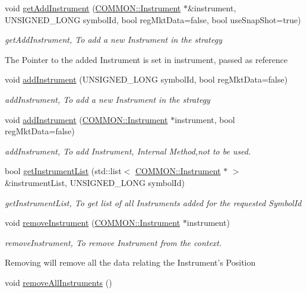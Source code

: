 \begin{DoxyCompactItemize}
void \hyperlink{class_a_p_i2_1_1_s_g_context_af8c29693539afd24c6dd420972c8871e}{get\-Add\-Instrument} (\hyperlink{class_a_p_i2_1_1_c_o_m_m_o_n_1_1_instrument}{C\-O\-M\-M\-O\-N\-::\-Instrument} $\ast$\&instrument, U\-N\-S\-I\-G\-N\-E\-D\-\_\-\-L\-O\-N\-G symbol\-Id, bool reg\-Mkt\-Data=false, bool use\-Snap\-Shot=true)
\begin{DoxyCompactList}\small\item\em get\-Add\-Instrument, To add a new Instrument in the strategy \par
 The Pointer to the added Instrument is set in instrument, passed as reference \end{DoxyCompactList}\item 
void \hyperlink{class_a_p_i2_1_1_s_g_context_ae7ae8c2b8c3b50861706d749bcceb77a}{add\-Instrument} (U\-N\-S\-I\-G\-N\-E\-D\-\_\-\-L\-O\-N\-G symbol\-Id, bool reg\-Mkt\-Data=false)
\begin{DoxyCompactList}\small\item\em add\-Instrument, To add a new Instrument in the strategy \par
 \end{DoxyCompactList}\item 
void \hyperlink{class_a_p_i2_1_1_s_g_context_a19cdaf5b68ddbd2632749dcc4b65cce6}{add\-Instrument} (\hyperlink{class_a_p_i2_1_1_c_o_m_m_o_n_1_1_instrument}{C\-O\-M\-M\-O\-N\-::\-Instrument} $\ast$instrument, bool reg\-Mkt\-Data=false)
\begin{DoxyCompactList}\small\item\em add\-Instrument, To add Instrument, Internal Method,not to be used. \end{DoxyCompactList}\item 
bool \hyperlink{class_a_p_i2_1_1_s_g_context_a456d032ab4229a08bfa237b33ffec76b}{get\-Instrument\-List} (std\-::list$<$ \hyperlink{class_a_p_i2_1_1_c_o_m_m_o_n_1_1_instrument}{C\-O\-M\-M\-O\-N\-::\-Instrument} $\ast$ $>$ \&instrument\-List, U\-N\-S\-I\-G\-N\-E\-D\-\_\-\-L\-O\-N\-G symbol\-Id)
\begin{DoxyCompactList}\small\item\em get\-Instrument\-List, To get list of all Instruments added for the requested Symbol\-Id \end{DoxyCompactList}\item 
void \hyperlink{class_a_p_i2_1_1_s_g_context_a0a40d0076984c9579847bf350628bea9}{remove\-Instrument} (\hyperlink{class_a_p_i2_1_1_c_o_m_m_o_n_1_1_instrument}{C\-O\-M\-M\-O\-N\-::\-Instrument} $\ast$instrument)
\begin{DoxyCompactList}\small\item\em remove\-Instrument, To remove Instrument from the context. \par
 Removing will remove all the data relating the Instrument's Position \end{DoxyCompactList}\item 
\hypertarget{class_a_p_i2_1_1_s_g_context_aa1290b0ce36edd31bea8615555f97f05}{void \hyperlink{class_a_p_i2_1_1_s_g_context_aa1290b0ce36edd31bea8615555f97f05}{remove\-All\-Instruments} ()}\label{class_a_p_i2_1_1_s_g_context_aa1290b0ce36edd31bea8615555f97f05}


\end{DoxyCompactItemize}
